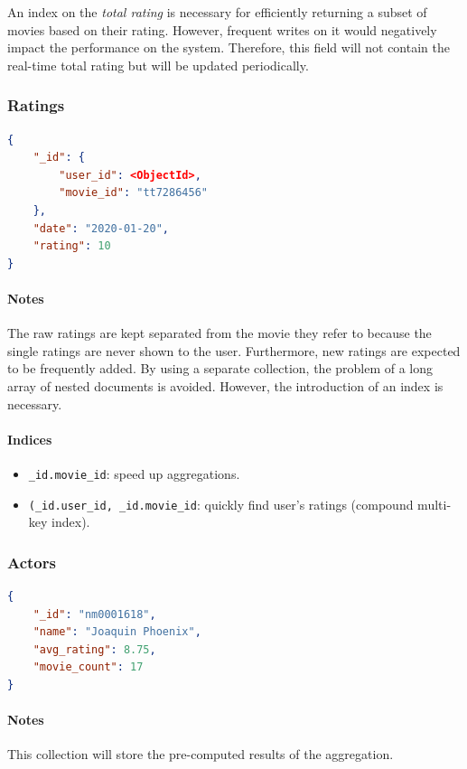 \documentclass[11pt]{article}
\begin{document}
An index on the \emph{total rating} is necessary for efficiently returning a 
subset of movies based on their rating. However, frequent writes on it would 
negatively impact the performance on the system. Therefore, this field will 
not contain the real-time total rating but will be updated periodically.

\subsubsection{Ratings}
\label{sec:ratings}

\begin{lstlisting}[language=json]	
{
	"_id": {
		"user_id": <ObjectId>,
		"movie_id": "tt7286456"
	},
	"date": "2020-01-20",
	"rating": 10
}
\end{lstlisting}

\paragraph{Notes}
The raw ratings are kept separated from the movie they refer to because the single 
ratings are never shown to the user. 
Furthermore, new ratings are expected to be frequently added.
By using a separate collection, the problem of a long array of nested documents 
is avoided. However, the introduction of an index is necessary.

\paragraph{Indices} 
\begin{itemize}
	\item \texttt{\_id.movie\_id}: speed up aggregations.
	\item \texttt{(\_id.user\_id, \_id.movie\_id}: quickly find user's ratings (compound multi-key index).
\end{itemize}

\subsubsection{Actors}
\label{sec:actors}

\begin{lstlisting}[language=json]	
{
	"_id": "nm0001618",
	"name": "Joaquin Phoenix",
	"avg_rating": 8.75,
	"movie_count": 17
}
\end{lstlisting}

\paragraph{Notes}
This collection will store the pre-computed results of the aggregation.
\end{document}
